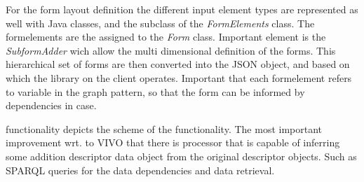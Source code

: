 
For the form layout definition the different input element types are represented as well with Java classes, and the subclass of the \textit{FormElements} class. The formelements are the assigned to the \textit{Form} class. Important element is the \textit{SubformAdder} wich allow the multi dimensional definition of the forms. This hierarchical set of forms are then converted into the JSON object, and based on which the library on the client operates. Important that each formelement refers to variable in the graph pattern, so that the form can be informed by dependencies in case. 

 functionality depicts the scheme of the functionality. The most important improvement wrt. to VIVO that there is processor that is capable of inferring some addition descriptor data object from the original descriptor objects. Such as SPARQL queries for the data dependencies and data retrieval.  




